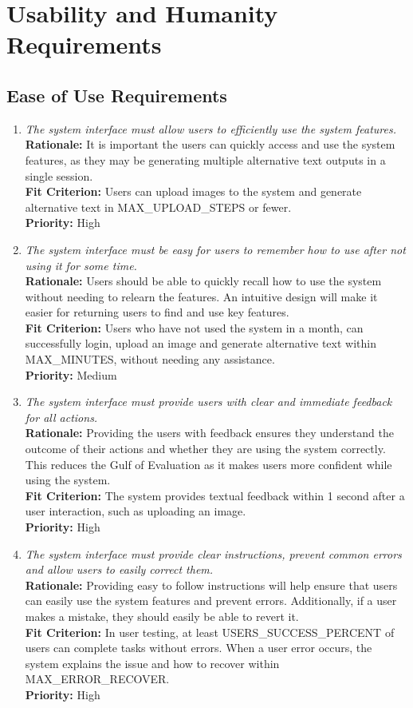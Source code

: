 \documentclass[12pt]{article}
\begin{document}
\section{Usability and Humanity Requirements}
\subsection{Ease of Use Requirements}
\begin{enumerate}[label=UHR-EUR \arabic*., wide=0pt, leftmargin=*]
\item \emph{The system interface must allow users to efficiently use the system features.}\\[2mm] 
    {\bf Rationale:} It is important the users can quickly access and use the system features, as they may be generating multiple alternative text outputs in a single session. \\
    {\bf Fit Criterion:} Users can upload images to the system and generate alternative text in MAX\_UPLOAD\_STEPS or fewer. \\
    {\bf Priority:} High
\item \emph{The system interface must be easy for users to remember how to use after not using it for some time.}\\[2mm] 
    {\bf Rationale:} Users should be able to quickly recall how to use the system without needing to relearn the features. An intuitive design will make it easier for returning users to find and use key features.  \\
    {\bf Fit Criterion:} Users who have not used the system in a month, can successfully login, upload an image and generate alternative text within MAX\_MINUTES, without needing any assistance. \\
    {\bf Priority:} Medium
\item \emph{The system interface must provide users with clear and immediate feedback for all actions.}\\[2mm] 
    {\bf Rationale:} Providing the users with feedback ensures they understand the outcome of their actions and whether they are using the system correctly. This reduces the Gulf of Evaluation as it makes users more confident while using the system. \\
    {\bf Fit Criterion:} The system provides textual feedback within 1 second after a user interaction, such as uploading an image.  \\
    {\bf Priority:} High 
\item \emph{The system interface must provide clear instructions, prevent common errors and allow users to easily correct them.}\\[2mm] 
    {\bf Rationale:} Providing easy to follow instructions will help ensure that users can easily use the system features and prevent errors. Additionally, if a user makes a mistake, they should easily be able to revert it.  \\
    {\bf Fit Criterion:} In user testing, at least USERS\_SUCCESS\_PERCENT of users can complete tasks without errors. When a user error occurs, the system explains the issue and how to recover within MAX\_ERROR\_RECOVER.\\
    {\bf Priority:} High 
\end{enumerate}
\end{document}
